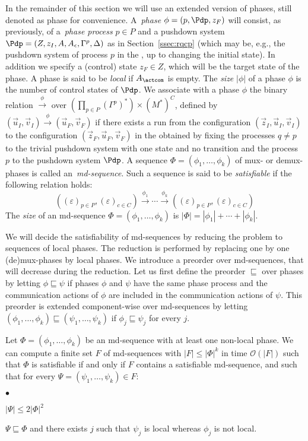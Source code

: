 \documentclass{LMCS}
\newenvironment{proposition}{\begin{prop}}{\end{prop}}
\begin{document}
In the remainder of this section we will use an extended version of
phases, still denoted as phase for convenience.
A~\emph{phase} $\phi=(p,\Pdp,z_F)$ will consist, as previously, of
a~\emph{phase process} $p \in P$ and a pushdown system
$\Pdp=(Z,z_I,A,A_\epsilon,\Gamma^p,\Delta)$ as in
Section~\ref{ssec:rqcp} (which may be, e.g., the
pushdown system of process $p$ in the \rqcp, up to changing the
initial state). In addition we specify a (control) state $z_F \in Z$,
which will be the target state of the phase. A phase is said to be \emph{local} if $A_\actcom$ is
empty.
The \emph{size} $|\phi|$ of a phase $\phi$ is
the number of control states of $\Pdp$.
We associate with a phase $\phi$ the binary
relation $\xrightarrow{\phi}$ over $(\prod_{p \in P} (\Gamma^p)^*)
\times (M^*)^C$, defined by
$(\vec{u}_I,\vec{v}_I)\xrightarrow{\phi}(\vec{u}_F,\vec{v}_F)$ if
there exists a run from the configuration
$(\vec{z}_I,\vec{u}_I,\vec{v}_I)$ to the configuration
$(\vec{z}_F,\vec{u}_F,\vec{v}_F)$ in the \rqcp obtained by fixing the
processes $q\not=p$ to the trivial pushdown system with one state and
no transition and the process $p$ to the pushdown system $\Pdp$. A
sequence $\Phi=(\phi_1,\ldots,\phi_k)$ of mux- or demux-phases
is called an~\emph{md-sequence}. Such a sequence is said
to be \emph{satisfiable} if the following relation holds:
$$((\varepsilon)_{p\in P},(\varepsilon)_{c\in
  C})\xrightarrow{\phi_1}\cdots\xrightarrow{\phi_k}((\varepsilon)_{p\in
  P},(\varepsilon)_{c\in C})$$
The \emph{size} of an md-sequence $\Phi=(\phi_1,\ldots,\phi_k)$ is
$|\Phi|=|\phi_1|+\cdots+|\phi_k|$.

We will decide the satisfiability of md-sequences by reducing
the problem to sequences of local phases. The reduction is
performed by replacing one by one (de)mux-phases by local
phases. We introduce a preorder over md-sequences, that will
decrease during the reduction. Let us first define the preorder
$\sqsubseteq$ over phases by letting $\phi\sqsubseteq
\psi$ if phases $\phi$ and $\psi$ have  the same phase process and the
communication actions of $\phi$ are included in the communication
actions of $\psi$. This preorder is extended component-wise over
md-sequences by letting $(\phi_1,\ldots,\phi_{k})\sqsubseteq
(\psi_1,\ldots,\psi_{k})$ if $\phi_j\sqsubseteq \psi_j$ for every
$j$.

\begin{proposition}\label{lem:red}
  Let $\Phi=(\phi_1,\ldots,\phi_k)$ be an md-sequence with at least
  one non-local phase. We can compute a finite set $F$ of
  md-sequences with $|F|\leq |\Phi|^k$ in time $\mathcal{O}(|F|)$ such
  that $\Phi$ is satisfiable if and only if $F$ contains a satisfiable
  md-sequence, and such that for every
  $\Psi=(\psi_1,\ldots,\psi_k)\in F$:
  \begin{iteMize}{$\bullet$}
  \item $|\Psi|\leq 2|\Phi|^2$
  \item $\Psi\sqsubseteq \Phi$ and there exists $j$ such that $\psi_j$
    is local whereas $\phi_j$ is not local.
  \end{iteMize}
\end{proposition}
\end{document}
